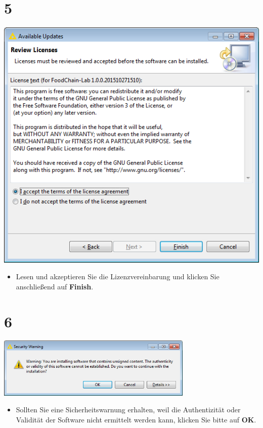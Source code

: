 \documentclass{beamer}
\begin{document}
\section{5}
\begin{frame}
	\begin{center}
  		\includegraphics[height=0.6\textheight]{5.png}
	\end{center}
	\begin{itemize}
		\item Lesen und akzeptieren Sie die Lizenzvereinbarung und klicken Sie anschließend auf \textbf{Finish}.
	\end{itemize}
\end{frame}

\section{6}
\begin{frame}
	\begin{center}
  		\includegraphics[width=0.7\textwidth]{6.png}
	\end{center}
	\begin{itemize}
		\item Sollten Sie eine Sicherheitswarnung erhalten, weil die Authentizität oder Validität der Software nicht ermittelt werden kann, klicken Sie bitte auf \textbf{OK}.
	\end{itemize}
\end{frame}
\end{document}
